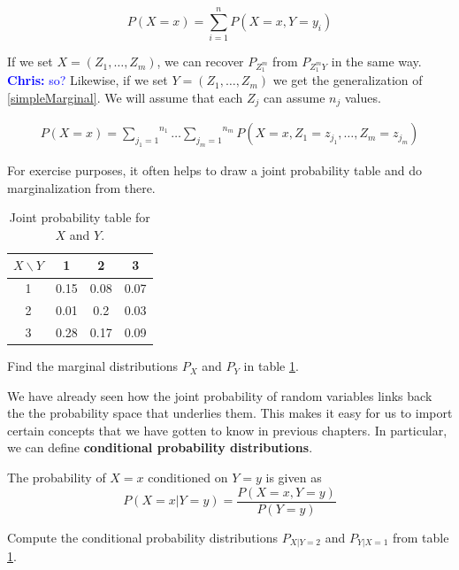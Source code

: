 \documentclass[a4paper,11pt,leqno]{report}
\newcommand{\chris}[1]{ \textcolor{blue}{\textbf{Chris:} #1}}
\begin{document}
\begin{equation} \label{simpleMarginal}
P(X=x) = \overset{n}{\underset{i=1}{\sum}} P(X=x,Y=y_{i}) 
\end{equation}

If we set $ X = (Z_{1}, \ldots, Z_{m}) $, we can recover $ P_{Z_{1}^{m}} $ from $ P_{Z_{1}^{m}Y} $ in the same way.\chris{so?} Likewise,
if we set $ Y = (Z_{1}, \ldots, Z_{m}) $ we get the generalization of \eqref{simpleMarginal}. We will assume that each $ Z_{j} $
can assume $ n_{j} $ values.

\begin{align}
P(X=x) = \overset{n_{1}}{\underset{j_{1}=1}{\sum}}\ldots \overset{n_{m}}{\underset{j_{m}=1}{\sum}} 
P(X=x,Z_{1}=z_{j_{1}}, \ldots, Z_{m}=z_{j_{m}})
\end{align}

For exercise purposes, it often helps to draw a joint probability table and do marginalization from there.

\begin{table}
\center
\begin{tabular}{|c|c|c|c|}
\hline
$X\backslash Y$	& 1		& 2		& 3		\\
\hline
1				& 0.15	& 0.08	& 0.07	\\
2				& 0.01	& 0.2	& 0.03	\\	
3				& 0.28	& 0.17	& 0.09	\\
\hline
\end{tabular}
\caption{Joint probability table for $ X $ and $ Y $.}
\label{jointTable}
\end{table}

\begin{Exercise}
Find the marginal distributions $ P_X $ and $ P_{Y} $ in table \ref{jointTable}.
\end{Exercise}

We have already seen how the joint probability of random variables links back the the probability space that underlies them.
This makes it easy for us to import certain concepts that we have gotten to know in previous chapters. In particular, we can
define \textbf{conditional probability distributions}.

\begin{Definition}
The probability of $ X = x $ conditioned on $ Y=y $ is given as
$$ P(X=x|Y=y) = \dfrac{P(X=x, Y=y)}{P(Y=y)} $$
\end{Definition} 

\begin{Exercise}
Compute the conditional probability distributions $ P_{X|Y=2} $ and $ P_{Y|X=1} $ from table \ref{jointTable}.
\end{Exercise}
\end{document}

